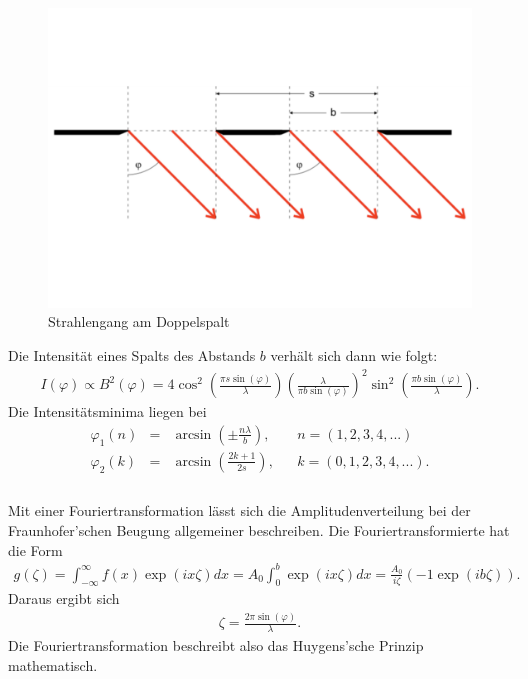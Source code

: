 \begin{figure}[h!]
  \centering
  \includegraphics[width=\textwidth]{doppelspalt.pdf}
  \caption{Strahlengang am Doppelspalt \cite{1}}
  \label{fig:doppelspalt}
\end{figure}
Die Intensität eines Spalts des Abstands $b$ verhält sich dann wie folgt:
\begin{align}
  I(\varphi) \propto B^2(\varphi)= 4 \cos^2{ \left( \frac{\pi s \sin{(\varphi)}}{\lambda} \right)} \left( \frac{\lambda}{\pi b \sin{(\varphi)}} \right)^2 \sin^2{\left( \frac{\pi b \sin{(\varphi)}}{\lambda} \right)}.
  \label{eqn:doppelspalt}
\end{align}
Die Intensitätsminima liegen bei
\begin{align*}
  \varphi_{1}(n) &=& \arcsin{\left( \pm \frac{n \lambda}{b} \right)},  &&  n=(1, 2, 3, 4, ...)\\
  \varphi_{2}(k) &=& \arcsin{ \left( \frac{2k+1}{2s} \right)}       ,  &&  k=(0, 1, 2, 3, 4, ...).\\
\end{align*}
\\Mit einer Fouriertransformation lässt sich die Amplitudenverteilung bei der Fraunhofer'schen Beugung allgemeiner beschreiben.
Die Fouriertransformierte hat die Form
\begin{align*}
  g(\zeta)= \int_{-\infty}^{\infty} f(x) \exp{(ix \zeta)} dx = A_{0} \int_{0}^{b} \exp{(ix \zeta)} dx = \frac{A_{0}}{i \zeta}(-1 \exp{(ib\zeta)}).
\end{align*}
Daraus ergibt sich
\begin{align*}
   \zeta = \frac{2 \pi \sin{(\varphi)}}{\lambda}.
\end{align*}
Die Fouriertransformation beschreibt also das Huygens'sche Prinzip mathematisch.

\FloatBarrier
